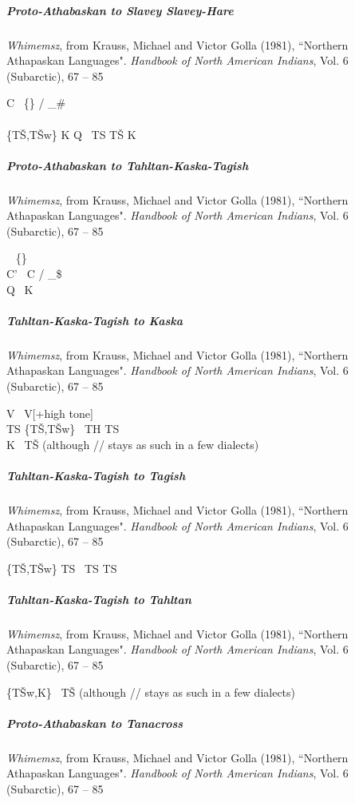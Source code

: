 \documentclass[11pt]{article}
\newcommand{\ipa}{\textipa}
\newcommand{\change}{\textrightarrow}
\begin{document}
\subparagraph{Proto-Athabaskan to Slavey Slavey-Hare}{\it Whimemsz}, from Krauss, Michael and Victor Golla (1981), ``Northern Athapaskan Languages". {\it Handbook of North American Indians}, Vol. 6 (Subarctic), 67 -- 85

C \change\ \{\ipa{h,P}\} / _\#\\
\ipa{A @ U} \change\ \ipa{a e o}\\
\{T\v{S},T\v{S}\super w\} K Q \change\ TS T\v{S} K

\subparagraph{Proto-Athabaskan to Tahltan-Kaska-Tagish}{\it Whimemsz}, from Krauss, Michael and Victor Golla (1981), ``Northern Athapaskan Languages". {\it Handbook of North American Indians}, Vol. 6 (Subarctic), 67 -- 85

\ipa{A @ U} \change\ \ipa{a} \{\ipa{i,e}\} \ipa{u}\\
C' \change\ C / _\$\\
Q \change\ K

\subparagraph{Tahltan-Kaska-Tagish to Kaska}{\it Whimemsz}, from Krauss, Michael and Victor Golla (1981), ``Northern Athapaskan Languages". {\it Handbook of North American Indians}, Vol. 6 (Subarctic), 67 -- 85

V\ipa{\super P} \change\ V[+high tone]\\
TS \{T\v{S},T\v{S}\super w\} \change\ TH TS\\
K \change\ T\v{S} (although /\ipa{x\super j}/ stays as such in a few dialects)

\subparagraph{Tahltan-Kaska-Tagish to Tagish}{\it Whimemsz}, from Krauss, Michael and Victor Golla (1981), ``Northern Athapaskan Languages". {\it Handbook of North American Indians}, Vol. 6 (Subarctic), 67 -- 85

\{T\v{S},T\v{S}\super w\} TS \change\ TS TS\ipa{\super j}

\subparagraph{Tahltan-Kaska-Tagish to Tahltan}{\it Whimemsz}, from Krauss, Michael and Victor Golla (1981), ``Northern Athapaskan Languages". {\it Handbook of North American Indians}, Vol. 6 (Subarctic), 67 -- 85

\{T\v{S}\super w,K\} \change\ T\v{S} (although /\ipa{x\super j}/ stays as such in a few dialects)

\subparagraph{Proto-Athabaskan to Tanacross}{\it Whimemsz}, from Krauss, Michael and Victor Golla (1981), ``Northern Athapaskan Languages". {\it Handbook of North American Indians}, Vol. 6 (Subarctic), 67 -- 85
\end{document}
